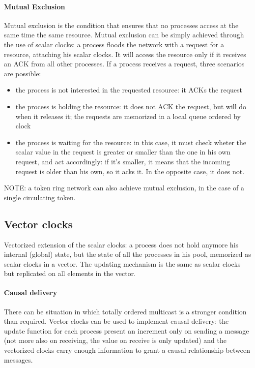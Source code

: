 \documentclass[10pt,a4paper]{article}
\begin{document}
				\paragraph{Mutual Exclusion}
					Mutual exclusion is the condition that ensures that no processes access at the same time the same resource. Mutual exclusion can be simply achieved through the use of scalar clocks: a process floods the network with a request for a resource, attaching his scalar clocks. It will access the resource only if it receives an ACK from all other processes. If a process receives a request, three scenarios are possible:
					\begin{itemize}
						\item the process is not interested in the requested resource: it ACKs the request
						\item the process is holding the resource: it does not ACK the request, but will do when it releases it; the requests are memorized in a local queue ordered by clock
						\item the process is waiting for the resource: in this case, it must check wheter the scalar value in the request is greater or smaller than the one in his own request, and act accordingly: if it's smaller, it means that the incoming request is older than his own, so it acks it. In the opposite case, it does not. 
					\end{itemize}
					NOTE: a token ring network can also achieve mutual exclusion, in the case of a single circulating token.
			
			\subsection{Vector clocks}
				Vectorized extension of the scalar clocks: a process does not hold anymore his internal (global) state, but the state of all the processes in his pool, memorized as scalar clocks in a vector. The updating mechanism is the same as scalar clocks but replicated on all elements in the vector.
				\paragraph{Causal delivery}
					There can be situation in which totally ordered multicast is a stronger condition than required. Vector clocks can be used to implement causal delivery: the update function for each process present an increment only on sending a message (not more also on receiving, the value on receive is only updated) and the vectorized clocks carry enough information to grant a causal relationship between messages.
\end{document}
